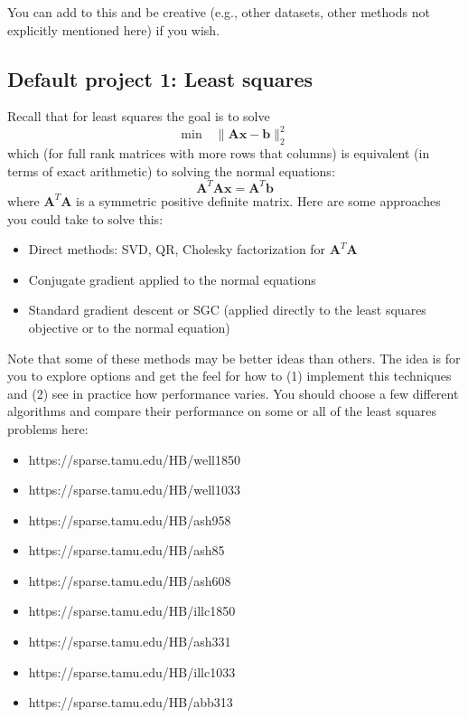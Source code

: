 \documentclass{article}
\newcommand{\mA}{\textbf{A}}
\newcommand{\vb}{\textbf{b}}
\newcommand{\vx}{\textbf{x}}
\begin{document}
You can add to this and be creative (e.g., other datasets, other methods not explicitly mentioned here) if you wish. 

\subsection{Default project 1: Least squares}
Recall that for least squares the goal is to solve
\begin{equation*}
	\text{min}\quad \| \mA\vx - \vb \|_2^2
\end{equation*}
which (for full rank matrices with more rows that columns) is equivalent (in terms of exact arithmetic) to solving the normal equations:
\begin{equation*}
\mA^T \mA \vx = \mA^T \vb
\end{equation*} 
where $\mA^T \mA$ is a symmetric positive definite matrix. Here are some approaches you could take to solve this:
\begin{itemize}
	\item Direct methods: SVD, QR, Cholesky factorization for $\mA^T \mA$
	\item Conjugate gradient applied to the normal equations
	\item Standard gradient descent or SGC (applied directly to the least squares objective or to the normal equation)
\end{itemize}
Note that some of these methods may be better ideas than others. The idea is for you to explore options and get the feel for how to (1) implement this techniques and (2) see in practice how performance varies. You should choose a few {different} algorithms and compare their performance on some or all of the least squares problems here:
\begin{itemize}
	\item https://sparse.tamu.edu/HB/well1850
	\item https://sparse.tamu.edu/HB/well1033
	\item 	https://sparse.tamu.edu/HB/ash958
	\item https://sparse.tamu.edu/HB/ash85
	\item https://sparse.tamu.edu/HB/ash608
	\item 	https://sparse.tamu.edu/HB/illc1850
	\item 	https://sparse.tamu.edu/HB/ash331
	\item 	https://sparse.tamu.edu/HB/illc1033
	\item 	https://sparse.tamu.edu/HB/abb313
\end{itemize}
\end{document}
